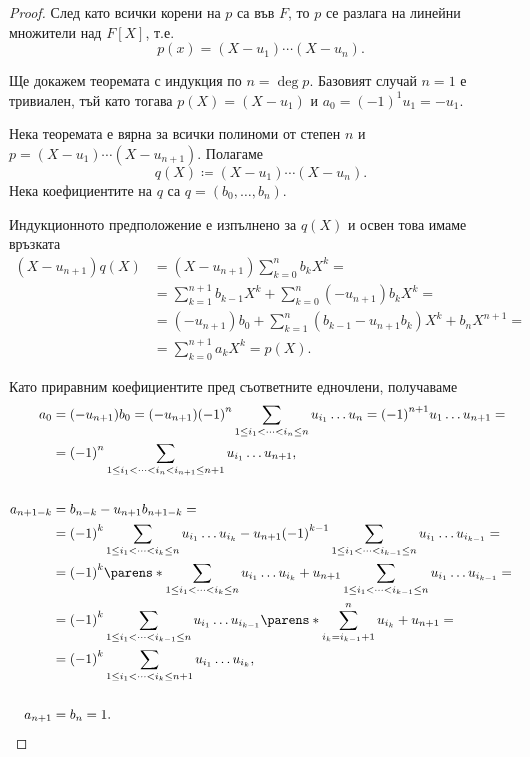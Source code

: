 \documentclass{../../common/topic}
\begin{document}
\begin{proof}
  След като всички корени на \( p \) са във \( F \), то \( p \) се разлага на линейни множители над \( F[X] \), т.е.
  \begin{equation*}
    p(x) = (X - u_1) \cdots (X - u_n).
  \end{equation*}

  Ще докажем теоремата с индукция по \( n = \deg p \). Базовият случай \( n = 1 \) е тривиален, тъй като тогава \( p(X) = (X - u_1) \) и \( a_0 = {(-1)}^1 u_1 = -u_1 \).

  Нека теоремата е вярна за всички полиноми от степен \( n \) и \( p = (X - u_1) \cdots (X - u_{n+1}) \). Полагаме
  \begin{equation*}
    q(X) \coloneqq (X - u_1) \cdots (X - u_n).
  \end{equation*}
  Нека коефициентите на \( q \) са \( q = (b_0, \ldots, b_n) \).

  Индукционното предположение е изпълнено за \( q(X) \) и освен това имаме връзката
  \begin{align*}
    (X - u_{n+1}) q(X)
    &=
    (X - u_{n+1}) \sum_{k=0}^n b_k X^k
    = \\ &=
    \sum_{k=1}^{n+1} b_{k-1} X^k + \sum_{k=0}^n (-u_{n+1}) b_k X^k
    = \\ &=
    (-u_{n+1}) b_0 + \sum_{k=1}^n (b_{k-1} - u_{n+1} b_k) X^k + b_n X^{n+1}
    = \\ &=
    \sum_{k=0}^{n+1} a_k X^k
    =
    p(X).
  \end{align*}

  Като приравним коефициентите пред съответните едночлени, получаваме
  \begin{align*}
    a_0
    &=
    (-u_{n+1}) b_0
    =
    (-u_{n+1}) {(-1)}^n \sum_{1 \leq i_1 < \cdots < i_n \leq n} u_{i_1} \ldots u_n
    =
    {(-1)}^{n+1} u_1 \ldots u_{n+1}
    = \\ &=
    {(-1)}^n \sum_{1 \leq i_1 < \cdots < i_n < i_{n+1} \leq n + 1} u_{i_1} \ldots u_{n+1},
    \\ \\
    a_{n+1-k}
    &=
    b_{n-k} - u_{n+1} b_{n+1-k}
    = \\ &=
    {(-1)}^k \sum_{1 \leq i_1 < \cdots < i_k \leq n} u_{i_1} \ldots u_{i_k} - u_{n+1} {(-1)}^{k-1} \sum_{1 \leq i_1 < \cdots < i_{k-1} \leq n} u_{i_1} \ldots u_{i_{k-1}}
    = \\ &=
    {(-1)}^k \parens*{ \sum_{1 \leq i_1 < \cdots < i_k \leq n} u_{i_1} \ldots u_{i_k} + u_{n+1} \sum_{1 \leq i_1 < \cdots < i_{k-1} \leq n} u_{i_1} \ldots u_{i_{k-1}} }
    = \\ &=
    {(-1)}^k \sum_{1 \leq i_1 < \cdots < i_{k-1} \leq n} u_{i_1} \ldots u_{i_{k-1}} \parens*{\sum_{i_k=i_{k-1}+1}^n u_{i_k} + u_{n+1} }
    = \\ &=
    {(-1)}^k \sum_{1 \leq i_1 < \cdots < i_k \leq n + 1} u_{i_1} \ldots u_{i_k},
    \\ \\
    a_{n+1} &= b_n = 1.
  \end{align*}
\end{proof}
\end{document}
